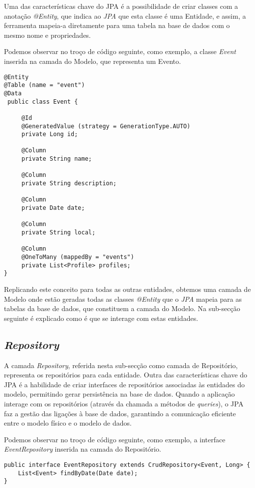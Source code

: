 Uma das características chave do JPA é a possibilidade de criar classes com a anotação \emph{@Entity}, que indica ao \emph{JPA} que esta classe é uma Entidade, e assim, a ferramenta mapeia-a diretamente para uma tabela na base de dados com o mesmo nome e propriedades.

Podemos observar no troço de código seguinte, como exemplo, a classe \emph{Event} inserida na camada do Modelo, que representa um Evento.


\begin{lstlisting}
@Entity 
@Table (name = "event")
@Data 
 public class Event {

	 @Id
	 @GeneratedValue (strategy = GenerationType.AUTO)
	 private Long id;
	
	 @Column
	 private String name;
	
	 @Column 
	 private String description;
	
	 @Column 
	 private Date date;
	
	 @Column 
	 private String local;
	
	 @Column 
	 @OneToMany (mappedBy = "events")
	 private List<Profile> profiles;
}
\end{lstlisting}


Replicando este conceito para todas as outras entidades, obtemos uma camada de Modelo onde estão geradas todas as classes \textit{@Entity} que o \textit{JPA} mapeia para as tabelas da base de dados, que constituem a camada do Modelo. Na sub-secção seguinte é explicado como é que se interage com estas entidades.

\subsection{\emph{Repository}} \label{sec312}
A camada \emph{Repository}, referida nesta sub-secção como camada de Repositório, representa os repositórios para cada entidade. 
Outra das características chave do JPA é a habilidade de criar interfaces de repositórios associadas às entidades do modelo, permitindo gerar persistência na base de dados. Quando a aplicação interage com os repositórios (através da chamada a métodos de \emph{queries}), o JPA faz a gestão das ligações à base de dados, garantindo a comunicação eficiente entre o modelo físico e o modelo de dados.

Podemos observar no troço de código seguinte, como exemplo, a interface \emph{EventRepository} inserida na camada do Repositório.

\begin{lstlisting}
public interface EventRepository extends CrudRepository<Event, Long> {
	List<Event> findByDate(Date date);
}
\end{lstlisting}

